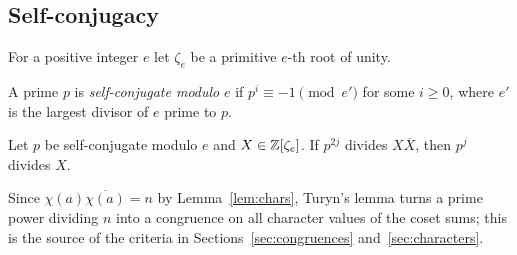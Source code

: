 \subsection{Self-conjugacy}
For a positive integer $e$ let $\zeta_e$ be a primitive $e$-th root of unity.

\begin{definition}\label{def:selfconj}
A prime $p$ is \emph{self-conjugate modulo} $e$ if $p^i \equiv -1 \pmod{e'}$ for some
$i \ge 0$, where $e'$ is the largest divisor of $e$ prime to $p$.
\end{definition}

\begin{lemma}\label{lem:turyn}
Let $p$ be self-conjugate modulo $e$ and $X \in \mathbb{Z}[\zeta_e]$. If $p^{2j}$ divides
$X\overline{X}$, then $p^j$ divides $X$.
\end{lemma}

Since $\chi(a)\overline{\chi(a)} = n$ by Lemma~\ref{lem:chars}, Turyn's lemma turns a prime
power dividing $n$ into a congruence on all character values of the coset sums; this is the
source of the criteria in Sections~\ref{sec:congruences} and~\ref{sec:characters}.
